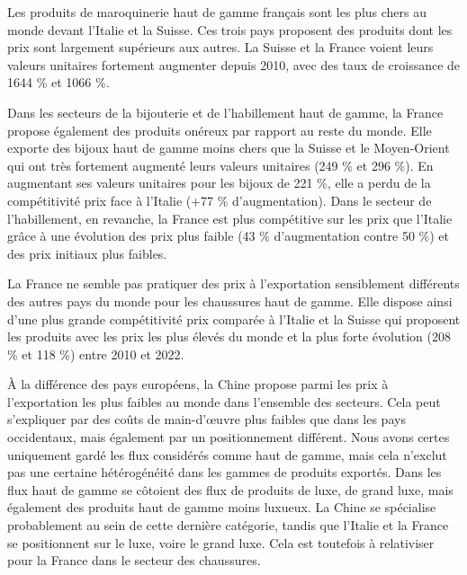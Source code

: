 \documentclass[french,10pt,a4paper]{article}
\begin{document}
Les produits de maroquinerie haut de gamme français sont les plus chers au monde devant l'Italie et la Suisse. Ces trois pays proposent des produits dont les prix sont largement supérieurs aux autres. La Suisse et la France voient leurs valeurs unitaires fortement augmenter depuis 2010, avec des taux de croissance de 1644 \% et 1066 \%.

Dans les secteurs de la bijouterie et de l'habillement haut de gamme, la France propose également des produits onéreux par rapport au reste du monde. Elle exporte des bijoux haut de gamme moins chers que la Suisse et le Moyen-Orient qui ont très fortement augmenté leurs valeurs unitaires (249 \% et 296 \%). En augmentant ses valeurs unitaires pour les bijoux de 221 \%, elle a perdu de la compétitivité prix face à l'Italie (+77 \% d'augmentation). Dans le secteur de l'habillement, en revanche, la France est plus compétitive sur les prix que l'Italie grâce à une évolution des prix plus faible (43 \% d'augmentation contre 50 \%) et des prix initiaux plus faibles.

La France ne semble pas pratiquer des prix à l'exportation sensiblement différents des autres pays du monde pour les chaussures haut de gamme. Elle dispose ainsi d'une plus grande compétitivité prix comparée à l'Italie et la Suisse qui proposent les produits avec les prix les plus élevés du monde et la plus forte évolution (208 \% et 118 \%) entre 2010 et 2022.

À la différence des pays européens, la Chine propose parmi les prix à l'exportation les plus faibles au monde dans l'ensemble des secteurs. Cela peut s'expliquer par des coûts de main-d'œuvre plus faibles que dans les pays occidentaux, mais également par un positionnement différent. Nous avons certes uniquement gardé les flux considérés comme haut de gamme, mais cela n'exclut pas une certaine hétérogénéité dans les gammes de produits exportés. Dans les flux haut de gamme se côtoient des flux de produits de luxe, de grand luxe, mais également des produits haut de gamme moins luxueux. La Chine se spécialise probablement au sein de cette dernière catégorie, tandis que l'Italie et la France se positionnent sur le luxe, voire le grand luxe. Cela est toutefois à relativiser pour la France dans le secteur des chaussures.

\bigskip
\end{document}
